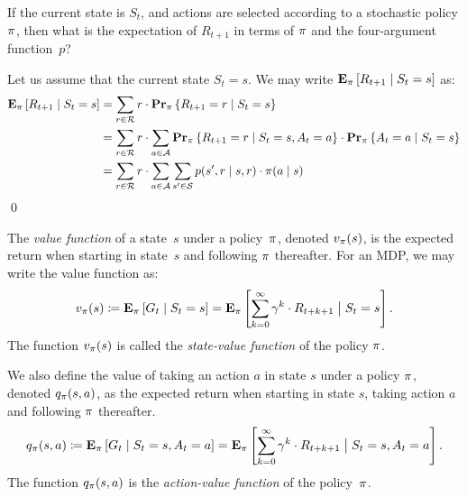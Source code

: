 \begin{exer}
If the current state is $S_t$, and actions are selected according to a stochastic
policy $\pi$, then what is the expectation of $R_{t + 1}$ in terms of 
$\pi$ and the four-argument function~$p$?
\end{exer}
\begin{solution}
Let us assume that the current state $S_t = s$. We may write 
$\mathbf{E}_{\pi} \left [ R_{t + 1} \mid S_t = s \right ]$ as:
\begin{align*}
    \mathbf{E}_{\pi} \left [ R_{t + 1} \mid S_t = s \right ] 
        & = \sum_{r \in \mathcal{R}} r \cdot \mathbf{Pr}_{\pi} \left \{ R_{t + 1} = r \mid S_t = s \right \} \\
        & = \sum_{r \in \mathcal{R}} r \cdot \sum_{a \in \mathcal{A}} 
                \mathbf{Pr}_{\pi} \left \{ R_{t + 1} = r\mid S_t = s, A_t = a \right \} 
                    \cdot \mathbf{Pr}_{\pi} \left \{ A_{t} = a \mid S_t = s \right \} \\ 
        & = \sum_{r \in \mathcal{R}} r \cdot \sum_{a \in \mathcal{A}} 
            \sum_{s' \in \mathcal{S}} p(s', r \mid s, r) \cdot \pi (a \mid s) 
\end{align*}
\qed
\end{solution}

The \emph{value function} of a state~$s$ under a policy~$\pi$, denoted 
$v_{\pi}(s)$, is the expected return when starting in state~$s$ and 
following $\pi$ thereafter. For an MDP, we may write the value function as:
\begin{equation}
    v_{\pi}(s) \coloneqq \mathbf{E}_{\pi} \left [ G_t \mid S_t = s \right ] 
        = \mathbf{E}_{\pi} \left [ \sum_{k = 0}^{\infty} \gamma^{k} \cdot R_{t + k + 1} \bigm\vert S_t = s  \right ].
\end{equation}
The function $v_{\pi}(s)$ is called the \emph{state-value function} of the policy $\pi$.

We also define the value of taking an action $a$ in state $s$ under a policy $\pi$, 
denoted $q_{\pi}(s, a)$, as the expected return when starting in state $s$, 
taking action $a$ and following $\pi$ thereafter.
\begin{equation}
    q_{\pi}(s, a) \coloneqq \mathbf{E}_{\pi} \left [ G_t \mid S_t = s, A_t = a \right ] 
        = \mathbf{E}_{\pi} \left [ \sum_{k = 0}^{\infty} \gamma^{k} \cdot R_{t + k + 1} \bigm\vert S_t = s, A_t = a \right ].
\end{equation}
The function $q_{\pi}(s, a)$ is the \emph{action-value function} of the policy~$\pi$. 

